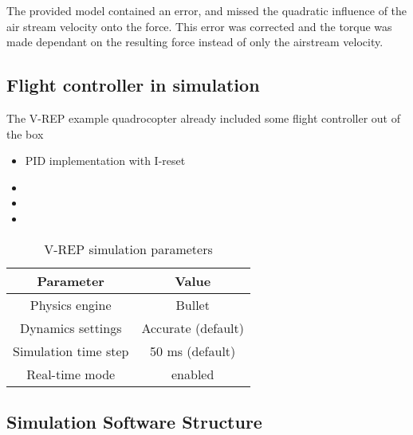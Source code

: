 The provided model contained an error,  and missed the quadratic influence of the air stream velocity onto the force. This error was corrected and the torque was made dependant on the resulting force instead of only the airstream velocity. 



\subsection{Flight controller in simulation}

The V-REP example quadrocopter already included some flight controller out of the box

\begin{itemize}
\item{PID implementation with I-reset}
\item{}
\item{}
\item{}
\end{itemize}



\begin{table}[h]
	\centering
	\begin{tabular}{|c|c|}
    		\hline
		Parameter & Value \\
		\hline
    		Physics engine & Bullet\\
    		\hline
    		Dynamics settings & Accurate (default) \\
    		\hline
    		Simulation time step & 50 ms (default) \\
    		\hline
    		Real-time mode & enabled \\
    		\hline
	\end{tabular}
    	\caption{V-REP simulation parameters}
      	\label{tab:simSettings}
\end{table}

\subsection{Simulation Software Structure}

